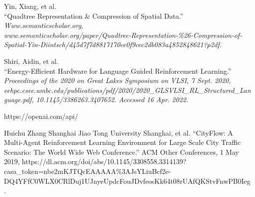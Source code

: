 \begin{thebibliography}{9}
Yin, Xiang, et al.\\
“Quadtree Representation \& Compression of Spatial Data.”\\
\textit{ Www.semanticscholar.org,\\ www.semanticscholar.org/paper/Quadtree-Representation-\%26-Compression-of-Spatial-Yin-Diintsch/d45d7f7d8817170ee0f9cec2db083a4852848621?p2df.}

Shiri, Aidin, et al.\\
“Energy-Efficient Hardware for Language Guided Reinforcement Learning.”\\
\textit{ Proceedings of the 2020 on Great Lakes Symposium on VLSI, 7 Sept. 2020, eehpc.csee.umbc.edu/publications/pdf/2020/2020\_GLSVLSI\_RL\_Structured\_Language.pdf, 10.1145/3386263.3407652. Accessed 16 Apr. 2022.}

 https://openai.com/api/
 
 Huichu Zhang Shanghai Jiao Tong University Shanghai, et al. “CityFlow: A Multi-Agent Reinforcement Learning Environment for Large Scale City Traffic Scenario: The World Wide Web Conference.” ACM Other Conferences, 1 May 2019, https://dl.acm.org/doi/abs/10.1145/3308558.3314139?casa\_token=nbe2mKJTQcEAAAAA\%3AJsYLiuBcf2e-DQ4YFfC0WLX0CRlDuj1UJnyeUpdcFouJDvfeosKk64t08rUAfQKStvFnwPB0Ieg. 
\end{thebibliography}
\clearpage %